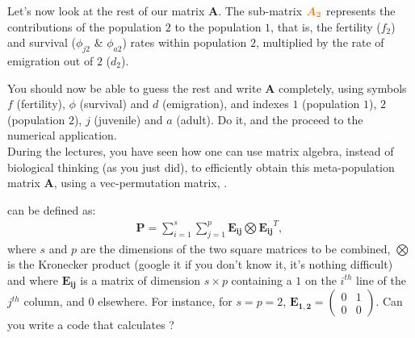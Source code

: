 \documentclass{article}\usepackage[]{graphicx}\usepackage[]{color}
\begin{document}
Let's now look at the rest of our matrix $\boldsymbol{A}$. The sub-matrix $\boldsymbol{\color{orange}{A_2}}$ represents the contributions of the population $2$ to the population $1$, that is, the fertility ($f_2$) and survival ($\phi_{j2}$ & $\phi_{a2}$) rates within population $2$, multiplied by the rate of emigration out of $2$ ($d_2$). 

You should now be able to guess the rest and write $\boldsymbol{A}$ completely, using symbols $f$ (fertility), $\phi$ (survival) and $d$ (emigration), and indexes $1$ (population $1$), $2$ (population $2$), $j$ (juvenile) and $a$ (adult).
Do it, and the proceed to the numerical application.\\


During the lectures, you have seen how one can use matrix algebra, instead of biological thinking (as you just did), to efficiently obtain this meta-population matrix $\boldsymbol{A}$, using a vec-permutation matrix, .

 can be defined as:
\begin{align*}
\boldsymbol{P} = \sum\limits_{i=1}^s  \sum\limits_{j=1}^p \boldsymbol{E_{ij}} \bigotimes \boldsymbol{E_{ij}}^T\text{, }
\end{align*}
where $s$ and $p$ are the dimensions of the two square matrices to be combined, $\bigotimes$ is the Kronecker product (google it if you don't know it, it's nothing difficult) and where $\boldsymbol{E_{ij}}$ is a matrix of dimension $s\times p$ containing a $1$ on the $i^{th}$ line of the $j^{th}$ column, and $0$ elsewhere. 
For instance, for $s=p=2$, $\boldsymbol{E_{1,2}} = \begin{pmatrix} 0 & 1 \\ 0 & 0 \end{pmatrix}$.
Can you write a code that calculates ?
\end{document}
